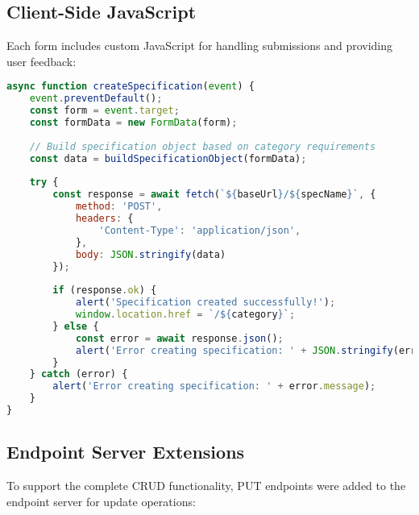 \documentclass[11pt,a4paper]{article}
\begin{document}
\subsection{Client-Side JavaScript}

Each form includes custom JavaScript for handling submissions and providing user feedback:

\begin{lstlisting}[language=JavaScript, caption=Client-Side Form Handling]
async function createSpecification(event) {
    event.preventDefault();
    const form = event.target;
    const formData = new FormData(form);
    
    // Build specification object based on category requirements
    const data = buildSpecificationObject(formData);
    
    try {
        const response = await fetch(`${baseUrl}/${specName}`, {
            method: 'POST',
            headers: {
                'Content-Type': 'application/json',
            },
            body: JSON.stringify(data)
        });
        
        if (response.ok) {
            alert('Specification created successfully!');
            window.location.href = `/${category}`;
        } else {
            const error = await response.json();
            alert('Error creating specification: ' + JSON.stringify(error));
        }
    } catch (error) {
        alert('Error creating specification: ' + error.message);
    }
}
\end{lstlisting}

\subsection{Endpoint Server Extensions}

To support the complete CRUD functionality, PUT endpoints were added to the endpoint server for update operations:
\end{document}
